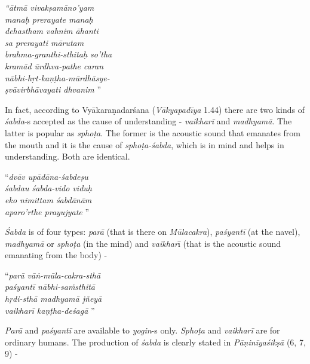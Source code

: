 \begin{centerquote}
\textit{“ātmā vivakṣamāno’yam}\\ \textit{manaḥ prerayate manaḥ} \\ \textit{dehastham vahnim āhanti}\\ \textit{sa prerayati mārutam} \\ \textit{brahma-granthi-sthitaḥ so’tha}\\ \textit{kramād ūrdhva-pathe caran} \\ \textit{nābhi-hṛt-kaṇṭha-mūrdhāsye-}\\ \textit{ṣvāvirbhāvayati dhvanim} ”
\end{centerquote}

In fact, according to Vyākaraṇadarśana (\textit{Vākyapadīya} 1.44) there are two kinds of \textit{śabda}-s accepted as the cause of understanding - \textit{vaikharī} and \textit{madhyamā}. The latter is popular as \textit{sphoṭa}. The former is the acoustic sound that emanates from the mouth and it is the cause of \textit{sphoṭa-śabda}, which is in mind and helps in understanding. Both are identical.

\newpage

\begin{centerquote}
“\textit{dvāv upādāna-śabdeṣu}\\ \textit{śabdau śabda-vido viduḥ} \\ \textit{eko nimittam śabdānām}\\ \textit{aparo’rthe prayujyate} ”
\end{centerquote}

\textit{Śabda} is of four types: \textit{parā} (that is there on \textit{Mūlacakra}), \textit{paśyantī} (at the navel), \textit{madhyamā} or \textit{sphoṭa} (in the mind) and \textit{vaikhar}ī (that is the acoustic sound emanating from the body) -

\begin{centerquote}
“\textit{parā vāṅ-mūla-cakra-sthā}\\ \textit{paśyantī nābhi-saṁsthitā }\\ \textit{hṛdi-sthā madhyamā jñeyā}\\ \textit{vaikharī kaṇṭha-deśagā} ” 
\end{centerquote}

\textit{Parā} and \textit{paśyantī} are available to \textit{yogin}-s only. \textit{Sphoṭa} and \textit{vaikharī} are for ordinary humans. The production of \textit{śabda} is clearly stated in \textit{Pāṇinīyaśikṣā} (6, 7, 9) -


